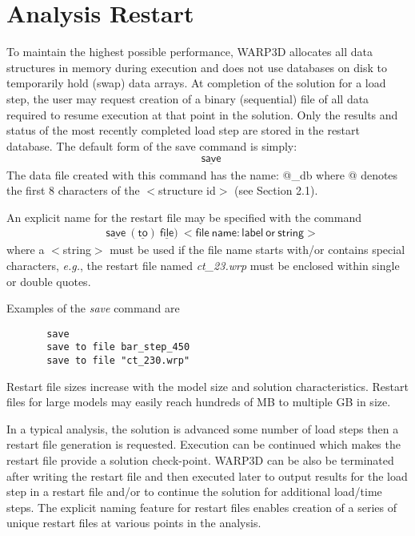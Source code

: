 \documentclass[11pt]{report}
\numberwithin{equation}{section}
\newcommand{\ul} {\underline}
\newcommand{\hv} {\mathsf}   %
\newcommand{\eg}{\emph{e.g.},\xspace}
\newcommand{\ti}{\emph}
\newcommand{\noi}{\noindent}
\begin{document}
\section{Analysis Restart}
\noi {\bf{\ti{Create a Restart File}}}

\noi To maintain the highest possible performance, WARP3D allocates all data structures 
in memory during execution and does not use databases on disk to temporarily hold (swap) data 
arrays. At completion of the solution for a load step, the user may request 
creation of a binary (sequential) file of all data required to resume execution 
at that point in the solution. Only the results and status of the most recently 
completed load step are stored in the restart database.
The default form of the save command is simply:
\begin{align*}
& \hv{{\ul{save}}\ }
\end{align*}
\noi The data file created with this command has the name: @\_db where @ denotes 
the first 8 characters of the $<$structure id$>$ (see Section 2.1).

An explicit name for the restart file may be specified with the command
\begin{align*}
& \hv{\ul{save}\ (\ul{to})\ \ul{file})\ <file\ name: label\ or\ string>}
\end{align*}
\noi where a $<$string$>$ must be used if the file name starts 
with/or contains special characters,
\eg the restart file named \ti{ct\_23.wrp} must be enclosed within 
single or double quotes. 

Examples of the \ti{save} command are
\small
\begin{verbatim}
       save 
       save to file bar_step_450 
       save to file "ct_230.wrp"
\end{verbatim}
\normalsize

\noi Restart file sizes increase with the model size and solution characteristics. 
Restart files for large models may easily reach hundreds of MB to 
multiple GB in size.

In a typical analysis, the solution is advanced some number of load steps then a 
restart file generation is requested. Execution can be continued
which makes the restart file provide a solution check-point. 
WARP3D can be also be terminated after writing the restart file and
then executed later to 
output results for the load step in a restart file and/or to
continue the solution for additional load/time steps. The explicit naming 
feature for restart files enables creation of a series of unique restart files at various 
points in the analysis.
\end{document}
